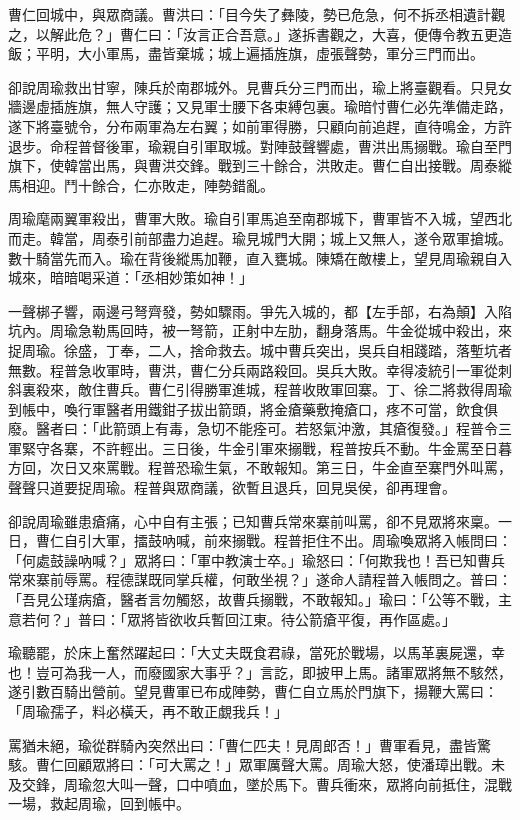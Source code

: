 曹仁回城中，與眾商議。曹洪曰：「目今失了彝陵，勢已危急，何不拆丞相遺計觀之，以解此危？」曹仁曰：「汝言正合吾意。」遂拆書觀之，大喜，便傳令教五更造飯；平明，大小軍馬，盡皆棄城；城上遍插旌旗，虛張聲勢，軍分三門而出。

卻說周瑜救出甘寧，陳兵於南郡城外。見曹兵分三門而出，瑜上將臺觀看。只見女牆邊虛插旌旗，無人守護；又見軍士腰下各束縛包裏。瑜暗忖曹仁必先準備走路，遂下將臺號令，分布兩軍為左右翼；如前軍得勝，只顧向前追趕，直待鳴金，方許退步。命程普督後軍，瑜親自引軍取城。對陣鼓聲響處，曹洪出馬搦戰。瑜自至門旗下，使韓當出馬，與曹洪交鋒。戰到三十餘合，洪敗走。曹仁自出接戰。周泰縱馬相迎。鬥十餘合，仁亦敗走，陣勢錯亂。

周瑜麾兩翼軍殺出，曹軍大敗。瑜自引軍馬追至南郡城下，曹軍皆不入城，望西北而走。韓當，周泰引前部盡力追趕。瑜見城門大開；城上又無人，遂令眾軍搶城。數十騎當先而入。瑜在背後縱馬加鞭，直入甕城。陳矯在敵樓上，望見周瑜親自入城來，暗暗喝采道：「丞相妙策如神！」

一聲梆子響，兩邊弓弩齊發，勢如驟雨。爭先入城的，都【左手部，右為顛】入陷坑內。周瑜急勒馬回時，被一弩箭，正射中左肋，翻身落馬。牛金從城中殺出，來捉周瑜。徐盛，丁奉，二人，捨命救去。城中曹兵突出，吳兵自相踐踏，落塹坑者無數。程普急收軍時，曹洪，曹仁分兵兩路殺回。吳兵大敗。幸得凌統引一軍從刺斜裏殺來，敵住曹兵。曹仁引得勝軍進城，程普收敗軍回寨。丁、徐二將救得周瑜到帳中，喚行軍醫者用鐵鉗子拔出箭頭，將金瘡藥敷掩瘡口，疼不可當，飲食俱廢。醫者曰：「此箭頭上有毒，急切不能痊可。若怒氣沖激，其瘡復發。」程普令三軍緊守各寨，不許輕出。三日後，牛金引軍來搦戰，程普按兵不動。牛金罵至日暮方回，次日又來罵戰。程普恐瑜生氣，不敢報知。第三日，牛金直至寨門外叫罵，聲聲只道要捉周瑜。程普與眾商議，欲暫且退兵，回見吳侯，卻再理會。

卻說周瑜雖患瘡痛，心中自有主張；已知曹兵常來寨前叫罵，卻不見眾將來稟。一日，曹仁自引大軍，擂鼓吶喊，前來搦戰。程普拒住不出。周瑜喚眾將入帳問曰：「何處鼓譟吶喊？」眾將曰：「軍中教演士卒。」瑜怒曰：「何欺我也！吾已知曹兵常來寨前辱罵。程德謀既同掌兵權，何敢坐視？」遂命人請程普入帳問之。普曰：「吾見公瑾病瘡，醫者言勿觸怒，故曹兵搦戰，不敢報知。」瑜曰：「公等不戰，主意若何？」普曰：「眾將皆欲收兵暫回江東。待公箭瘡平復，再作區處。」

瑜聽罷，於床上奮然躍起曰：「大丈夫既食君祿，當死於戰場，以馬革裏屍還，幸也！豈可為我一人，而廢國家大事乎？」言訖，即披甲上馬。諸軍眾將無不駭然，遂引數百騎出營前。望見曹軍已布成陣勢，曹仁自立馬於門旗下，揚鞭大罵曰：「周瑜孺子，料必橫夭，再不敢正覷我兵！」

罵猶未絕，瑜從群騎內突然出曰：「曹仁匹夫！見周郎否！」曹軍看見，盡皆驚駭。曹仁回顧眾將曰：「可大罵之！」眾軍厲聲大罵。周瑜大怒，使潘璋出戰。未及交鋒，周瑜忽大叫一聲，口中噴血，墜於馬下。曹兵衝來，眾將向前抵住，混戰一場，救起周瑜，回到帳中。

